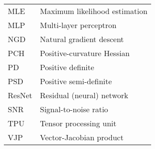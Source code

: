 \begin{longtable}{p{.2\linewidth}p{.8\linewidth}}
  MLE & Maximum likelihood estimation
  \\
  MLP & Multi-layer perceptron
  \\
  NGD & Natural gradient descent
  \\
  PCH & Positive-curvature Hessian
  \\
  PD & Positive definite
  \\
  PSD & Positive semi-definite
  \\
  ResNet & Residual (neural) network
  \\
  SNR & Signal-to-noise ratio
  \\
  TPU & Tensor processing unit
  \\
  VJP & Vector-Jacobian product
\end{longtable}

